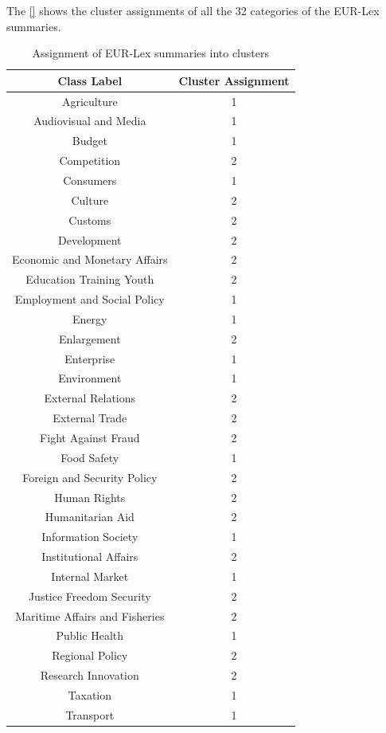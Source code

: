 The \ref{} shows the cluster assignments of all the 32 categories of the EUR-Lex summaries.

\begin{table}[!ht]
\centering
\begin{tabular}{cc}
\hline
\textbf{Class Label} & \textbf{Cluster Assignment} \\ \hline
Agriculture & 1 \\ 
Audiovisual and Media & 1 \\ 
Budget & 1 \\ 
Competition & 2 \\ 
Consumers & 1 \\ 
Culture & 2 \\ 
Customs & 2 \\ 
Development & 2 \\ 
Economic and Monetary Affairs & 2 \\ 
Education Training Youth & 2 \\ 
Employment and Social Policy & 1 \\ 
Energy & 1 \\ 
Enlargement & 2 \\ 
Enterprise & 1 \\ 
Environment & 1 \\ 
External Relations & 2 \\ 
External Trade & 2 \\ 
Fight Against Fraud & 2 \\ 
Food Safety & 1 \\ 
Foreign and Security Policy & 2 \\ 
Human Rights & 2 \\ 
Humanitarian Aid & 2 \\ 
Information Society & 1 \\ 
Institutional Affairs & 2 \\ 
Internal Market & 1 \\ 
Justice Freedom Security & 2 \\ 
Maritime Affairs and Fisheries & 2 \\ 
Public Health & 1 \\ 
Regional Policy & 2 \\ 
Research Innovation & 2 \\ 
Taxation & 1 \\ 
Transport & 1 \\ \hline
\end{tabular}
\caption{Assignment of EUR-Lex summaries into clusters}
\label{table:ClusterAssignments32Classes}
\end{table}


